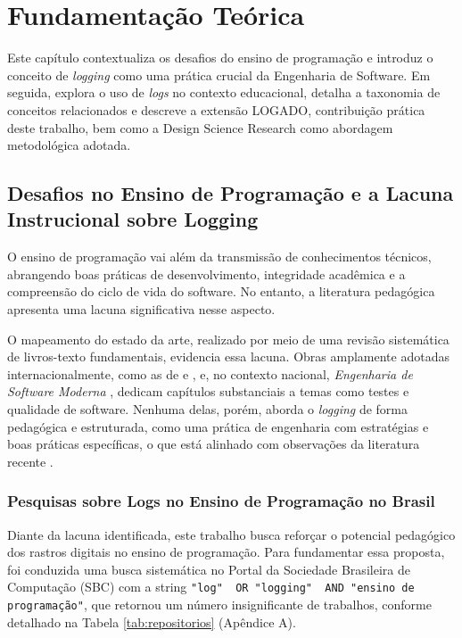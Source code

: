 \chapter{Fundamentação Teórica}
\label{cap:fundamentacao}

Este capítulo contextualiza os desafios do ensino de programação e introduz o conceito de \textit{logging} como uma prática crucial da Engenharia de Software. Em seguida, explora o uso de \textit{logs} no contexto educacional, detalha a taxonomia de conceitos relacionados e descreve a extensão LOGADO, contribuição prática deste trabalho, bem como a Design Science Research como abordagem metodológica adotada.

\section{Desafios no Ensino de Programação e a Lacuna Instrucional sobre Logging}
\label{sec:desafios-lacuna}

O ensino de programação vai além da transmissão de conhecimentos técnicos, abrangendo boas práticas de desenvolvimento, integridade acadêmica e a compreensão do ciclo de vida do software. No entanto, a literatura pedagógica apresenta uma lacuna significativa nesse aspecto.

O mapeamento do estado da arte, realizado por meio de uma revisão sistemática de livros-texto fundamentais, evidencia essa lacuna. Obras amplamente adotadas internacionalmente, como as de \citet{pressman2020} e \citet{sommerville2016}, e, no contexto nacional, \textit{Engenharia de Software Moderna} \citet{valente2020}, dedicam capítulos substanciais a temas como testes e qualidade de software. Nenhuma delas, porém, aborda o \textit{logging} de forma pedagógica e estruturada, como uma prática de engenharia com estratégias e boas práticas específicas, o que está alinhado com observações da literatura recente \cite{gu2022logging}.

\subsection{Pesquisas sobre Logs no Ensino de Programação no Brasil}

Diante da lacuna identificada, este trabalho busca reforçar o potencial pedagógico dos rastros digitais no ensino de programação. Para fundamentar essa proposta, foi conduzida uma busca sistemática no Portal da Sociedade Brasileira de Computação (SBC) com a string \texttt{"log"~ OR "logging"~ AND "ensino de programação"}, que retornou um número insignificante de trabalhos, conforme detalhado na Tabela \ref{tab:repositorios} (Apêndice A).

